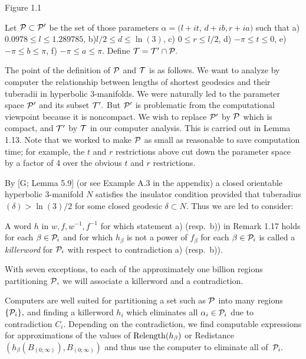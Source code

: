  \centerline{Figure 1.1}

 \hglue-8pt Let ${\cal P}\subset{\cal P}^{\prime}$ be the set of those parameters $\alpha
= (l+it$, $d+ib, r+ia)$ such
that
 a)       $0.0978\le l \le 1.289785$,
 b)\enspace      $l/2 \le d\le \ln(3)$,
 c) \enspace   $0\le r \le l/2$,
 d) \enspace      $-\pi \le t \le 0$,
 e) \enspace	$-\pi \le b \le \pi$,
 f) \enspace	$-\pi \le a \le \pi$.
\noindent 
Define ${\cal T}={\cal T}^{\prime}\cap {\cal P}.$
\enddemo

The point of the definition of ${\cal P}$ and ${\cal T}$ is as follows.  We want to analyze by computer the relationship between lengths of shortest geodesics  and their tuberadii in hyperbolic $3$-manifolds.  We were naturally led to the parameter space 
${\cal P}^{\prime}$ and its subset ${\cal T}^{\prime}.$  But 
${\cal P}^{\prime}$ is problematic from the computational viewpoint because it is noncompact.  We wish to replace 
${\cal P}^{\prime}$ by ${\cal P}$ which is compact, and 
${\cal T}^{\prime}$ by ${\cal T}$ in our computer analysis.  This is carried out in Lemma 1.13.  Note that we worked to make ${\cal P}$ as small as reasonable to save computation time;  for example, the $t$ and $r$ restrictions above cut down the parameter space by a factor of 4 over the obvious $t$ and $r$ restrictions. 

By [G; Lemma 5.9] (or see Example A.3 in the appendix) a closed orientable hyperbolic $3$-manifold $N$
satisfies the insulator condition provided that
tuberadius$(\delta) > \ln(3)/2$ for some closed geodesic $\delta\subset N.$  Thus we
are led to consider:

  A word $h$ in $w,f,w^{-1},f^{-1}$ for which statement a) (resp.\ b)) in Remark 1.17 holds for each $\beta\in {\cal P}_i$
and for which $h_\beta$ is not a power of $f_\beta$ for each $\beta\in {\cal P}_i$ is
called a {\it killerword} for ${\cal P}_i$ with respect to contradiction a) (resp.\ b)).

  With seven exceptions,  to each of the approximately one
billion regions partitioning ${\cal P},$ we will
associate a killerword and a contradiction.  \enddemo 

  Computers are well suited for partitioning a set such as ${\cal P}$
into many regions $\{{\cal P}_i \},$ and finding a
killerword $h_i$ which eliminates all $\alpha_i \in {\cal P}_i $ due to contradiction $C_i.$
Depending on the contradiction, we find
computable expressions  for approximations of the values of
${\rm Relength}(h_\beta)$ or Redistance$(h_\beta(B_{(0;\infty)}), B_{(0;\infty)})$ and
thus use the computer to eliminate all of~${\cal P}_i .$ 
\enddemo

